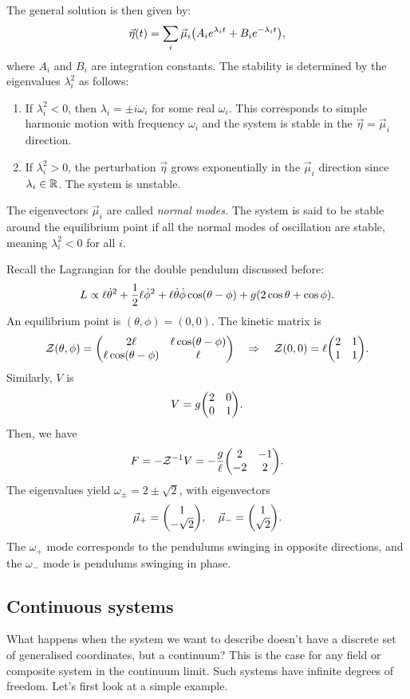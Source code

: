\documentclass{article}
\begin{document}
The general solution is then given by:
\begin{equation}
	\vec{\eta}(t) = \sum_{i} \vec{\mu}_{i} \qty( A_{i} e^{\lambda_{i}t} + B_{i} e^{-\lambda_{i}t} ),
\end{equation}
where $ A_{i} $ and $ B_{i} $ are integration constants. The stability is determined by the eigenvalues $ \lambda_{i}^{2} $ as follows:
\begin{enumerate}
	\item If $ \lambda_{i}^{2} < 0 $, then $ \lambda_{i} = \pm i \omega_{i} $ for some real $ \omega_{i} $. This corresponds to simple harmonic motion with frequency $ \omega_{i} $ and the system is stable in the $ \vec{\eta} = \vec{\mu}_{i} $ direction.
	\item If $ \lambda_{i}^{2} > 0 $, the perturbation $ \vec{\eta} $ grows exponentially in the $ \vec{\mu}_{i} $ direction since $ \lambda_{i} \in \mathbb{R} $. The system is unstable.
\end{enumerate}
The eigenvectors $ \vec{\mu}_{i} $ are called \textit{normal modes.} The system is said to be stable around the equilibrium point if all the normal modes of oscillation are stable, meaning $ \lambda_{i}^{2} < 0 $ for all $ i $. 
\begin{example}
	Recall the Lagrangian for the double pendulum discussed before:
	\[
		L \propto \ell \dot{\theta}^{2} + \frac{1}{2} \ell \dot{\phi}^{2} + \ell \dot{\theta} \dot{\phi} \cos(\theta - \phi) + g \qty(2\cos\theta + \cos \phi).
	\]
	An equilibrium point is $ (\theta, \phi) = (0,0) $. The kinetic matrix is
	\[
		\mathcal{Z}(\theta,\phi) = \mqty(2 \ell & \ell \cos(\theta-\phi) \\ \ell \cos(\theta-\phi) & \ell) \implies \mathcal{Z}(0,0) = \ell \mqty(2 & 1 \\ 1 & 1).
	\]
	Similarly, $ V $ is
	\[
		V = g\mqty(2 & 0 \\ 0 & 1).
	\]
	Then, we have
	\[
		F = - \mathcal{Z}^{-1} V = -\frac{g}{\ell} \mqty(2 & -1 \\ -2 & 2).
	\]
	The eigenvalues yield $ \omega_{\pm} = 2 \pm \sqrt{2} $, with eigenvectors
	\[
		\vec{\mu}_{+} = \mqty(1 \\ -\sqrt{2}), \quad \vec{\mu}_{-} = \mqty(1 \\ \sqrt{2}).
	\]
	The $ \omega_{+} $ mode corresponds to the pendulums swinging in opposite directions, and the $ \omega_{-} $ mode is pendulums swinging in phase.
\end{example}
\subsection{Continuous systems}
What happens when the system we want to describe doesn't have a discrete set of generalised coordinates, but a continuum? This is the case for any field or composite system in the continuum limit. Such systems have infinite degrees of freedom. Let's first look at a simple example.
\end{document}
